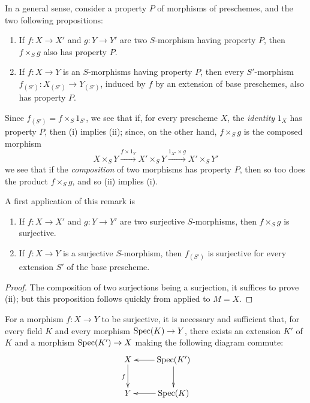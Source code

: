 \begin{env}[3.5.1]
\label{1.3.5.1}
In a general sense, consider a property $P$ of morphisms of preschemes, and the two following propositions:
\begin{enumerate}[label=(\roman*)]
  \item If $f:X\to X'$ and $g:Y\to Y'$ are two $S$-morphism having property $P$, then $f\times_S g$ also has property $P$.
  \item If $f:X\to Y$ is an $S$-morphisms having property $P$, then every $S'$-morphism $f_{(S')}:X_{(S')}\to Y_{(S')}$, induced by $f$ by an extension of base preschemes, also has property $P$.
\end{enumerate}

Since $f_{(S')}=f\times_S 1_{S'}$, we see that if, for every prescheme $X$, the \emph{identity} $1_X$ has property $P$, then (i) implies (ii); since, on the other hand, $f\times_S g$ is the composed morphism
\[
  X\times_S Y \xrightarrow{f\times1_Y} X'\times_S Y \xrightarrow{1_{X'}\times g} X'\times_S Y'
\]
we see that if the \emph{composition} of two morphisms has property $P$, then so too does the product $f\times_S g$, and so (ii) implies (i).
\end{env}

A first application of this remark is
\begin{prop}[3.5.2]
\label{1.3.5.2}
\medskip\noindent
\begin{enumerate}[label=\emph{(\roman*)}]
  \item If $f:X\to X'$ and $g:Y\to Y'$ are two surjective $S$-morphisms, then $f\times_S g$ is surjective.
  \item If $f:X\to Y$ is a surjective $S$-morphism, then $f_{(S')}$ is surjective for every extension $S'$ of the base prescheme.
\end{enumerate}
\end{prop}

\begin{proof}
\label{proof-1.3.5.2}
The composition of two surjections being a surjection, it suffices to prove (ii); but this proposition follows quickly from  applied to $M=X$.
\end{proof}

\begin{prop}[3.5.3]
\label{1.3.5.3}
For a morphism $f:X\to Y$ to be surjective, it is necessary and sufficient that, for every field $K$ and every morphism $\Spec(K)\to Y$, there exists an extension $K'$ of $K$ and a morphism $\Spec(K')\to X$ making the following diagram commute:
\[
  \xymatrix{
    X\ar[d]_f &
    \Spec(K')\ar[l]\ar[d]\\
    Y &
    \Spec(K)\ar[l]
  }
\]
\end{prop}

